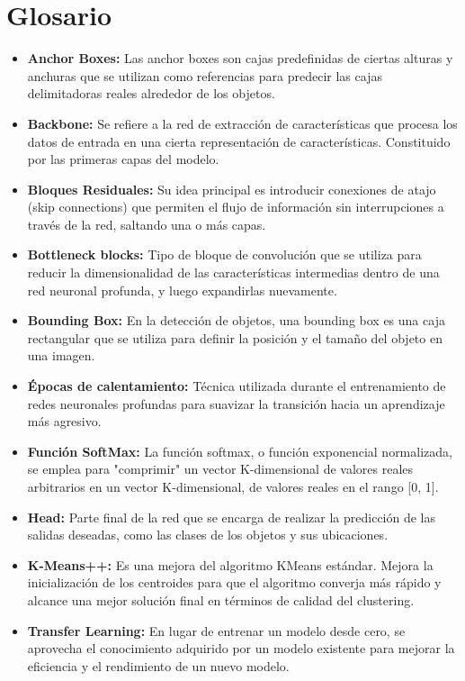\documentclass{article}
\begin{document}
\section{Glosario}
\begin{itemize}
\item{\textbf{Anchor Boxes:} Las anchor boxes son cajas predefinidas de ciertas alturas y anchuras que se utilizan como referencias para predecir las cajas delimitadoras reales alrededor de los objetos.}
\item{\textbf{Backbone:} Se refiere a la red de extracción de características que procesa los datos de entrada en una cierta representación de características. Constituido por las primeras capas del modelo.}
\item{\textbf{Bloques Residuales:} Su idea principal es introducir conexiones de atajo (skip connections) que permiten el flujo de información sin interrupciones a través de la red, saltando una o más capas.}
\item{\textbf{Bottleneck blocks:} Tipo de bloque de convolución que se utiliza para reducir la dimensionalidad de las características intermedias dentro de una red neuronal profunda, y luego expandirlas nuevamente.}
\item{\textbf{Bounding Box:} En la detección de objetos, una bounding box es una caja rectangular que se utiliza para definir la posición y el tamaño del objeto en una imagen.}
\item{\textbf{Épocas de calentamiento:} Técnica utilizada durante el entrenamiento de redes neuronales profundas para suavizar la transición hacia un aprendizaje más agresivo.}
\item{\textbf{Función SoftMax:} La función softmax, o función exponencial normalizada, se emplea para "comprimir" un vector K-dimensional  de valores reales arbitrarios en un vector K-dimensional, de valores reales en el rango [0, 1].}
\item{\textbf{Head:} Parte final de la red que se encarga de realizar la predicción de las salidas deseadas, como las clases de los objetos y sus ubicaciones.}
\item{\textbf{K-Means++:} Es una mejora del algoritmo KMeans estándar. Mejora la inicialización de los centroides para que el algoritmo converja más rápido y alcance una mejor solución final en términos de calidad del clustering.}
\item{\textbf{Transfer Learning:} En lugar de entrenar un modelo desde cero, se aprovecha el conocimiento adquirido por un modelo existente para mejorar la eficiencia y el rendimiento de un nuevo modelo.}
\end{itemize}

 
\end{document}
